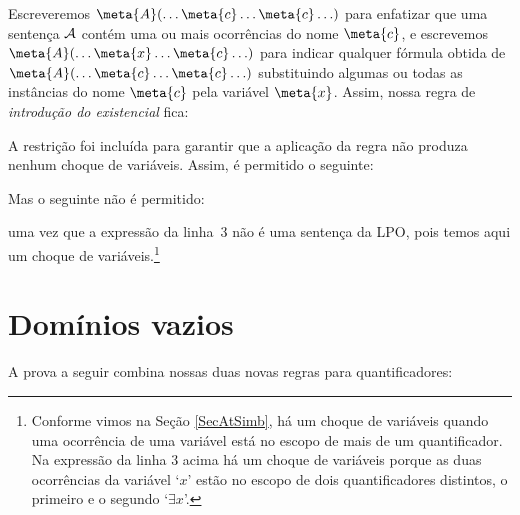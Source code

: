 Escreveremos $\meta{A}(\ldots \meta{c} \ldots \meta{c}\ldots)$ para enfatizar que uma sentença $\mathcal{A}$ contém uma ou mais ocorrências do nome $\meta{c}$, e escrevemos $\meta{A}(\ldots \meta{x} \ldots \meta{c}\ldots)$ para indicar qualquer fórmula obtida de $\meta{A}(\ldots \meta{c} \ldots \meta{c}\ldots)$ substituindo algumas ou todas as instâncias do nome  $\meta{c}$ pela variável $\meta{x}$. Assim, nossa regra de \textit{introdução do existencial} fica:
 
\label{RegraEI}
A restrição foi incluída para garantir que a aplicação da regra não produza nenhum choque de variáveis. Assim, é permitido o seguinte:

\begin{fitchproof}
	 
	 
\end{fitchproof}
Mas o seguinte  não é permitido:
\begin{fitchproof}
	 
\end{fitchproof}
uma vez que a expressão da linha~3 não é uma sentença da LPO, pois 
temos aqui um choque de variáveis.\footnote{Conforme vimos na Seção \ref{SecAtSimb}, há um choque de variáveis quando uma ocorrência de uma variável está no escopo de mais de um quantificador. Na expressão da linha 3 acima há um choque de variáveis porque as duas ocorrências da variável `$x$' estão no escopo de dois quantificadores distintos, o primeiro e o segundo `$\exists x$'.}

\section{Domínios vazios}
A prova a seguir combina nossas duas novas regras para quantificadores:
	\begin{fitchproof}
	\end{fitchproof}

